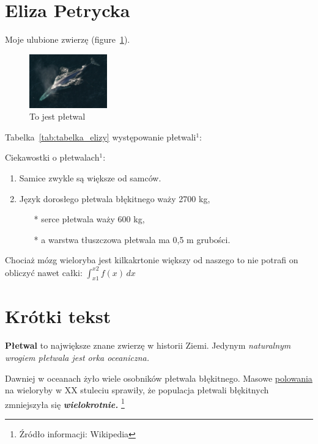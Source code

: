 \section{Eliza Petrycka}
\label{sec:Eliza}

Moje ulubione zwierzę (figure~\ref{fig:pletwal}).

\begin{figure}[htbp]
    \centering
    \includegraphics[width=0.3\textwidth]{pictures/eliza.jpg}
    \caption{To jest płetwal}
    \label{fig:pletwal}
\end{figure}

Tabelka~\ref{tab:tabelka_elizy} występowanie płetwali$^1$:


Ciekawostki o płetwalach$^1$:
\begin{enumerate}
  \item Samice zwykle są większe od samców.
  \item Język dorosłego płetwala błękitnego waży 2700 kg,
    \begin{itemize}
    \item[*] serce płetwala waży 600 kg,
    \item[*] a warstwa tłuszczowa płetwala ma 0,5 m grubości.
    \end{itemize}
\end{enumerate}

Chociaż mózg wieloryba jest kilkakrtonie większy od naszego to nie potrafi on obliczyć nawet całki: $\int_{x1}^{x2} f(x) \, dx$

\setlength{\parindent}{20pt}

\section*{Krótki tekst}

\textbf{Płetwal} to największe znane zwierzę w historii Ziemi. Jedynym \textit{ naturalnym wrogiem \emph{płetwala jest orka oceaniczna.}}

Dawniej w oceanach żyło wiele osobników płetwala błękitnego. 
\newline
Masowe \underline{polowania }na wieloryby w XX stuleciu sprawiły, że populacja płetwali błękitnych zmniejszyła się \textbf{\textit{wielokrotnie.}}
\footnote{Źródło informacji: Wikipedia}